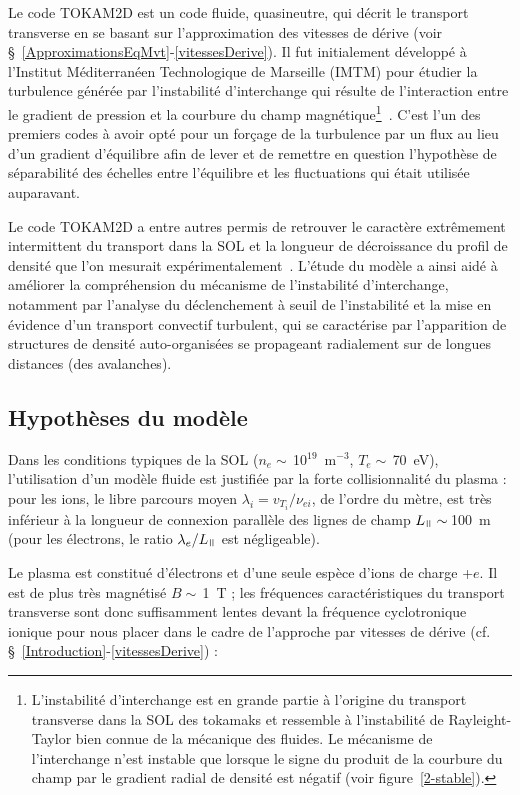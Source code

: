 \begin{refsection}
Le code TOKAM2D est un code fluide, quasineutre, qui décrit le transport
transverse en se basant sur l'approximation des vitesses de dérive (voir
\S~\ref{ApproximationsEqMvt}-\ref{vitessesDerive}). Il fut initialement
développé à l'Institut Méditerranéen Technologique de Marseille (IMTM) pour
étudier la turbulence générée par l'instabilité
d'interchange qui résulte de
l'interaction entre le gradient de pression et la courbure du champ
magnétique\footnote{L'instabilité d'interchange est en grande partie
à l'origine du transport transverse dans la SOL des tokamaks et ressemble à l'instabilité de Rayleight-Taylor bien
connue de la mécanique des fluides.
Le mécanisme de l'interchange n'est instable que lorsque le signe du produit de
la courbure du champ par le gradient radial de densité est négatif (voir
figure~\ref{2-stable}).}~\parencite{Garbet}.
C'est l'un des premiers codes à avoir opté pour un forçage de la turbulence par
un flux au lieu d'un gradient d'équilibre afin de lever et de remettre en question l'hypothèse de séparabilité des échelles entre l'équilibre et les fluctuations qui était utilisée auparavant.

Le code TOKAM2D a entre autres permis de retrouver le caractère extrêmement
intermittent du transport dans la SOL et la longueur de décroissance du profil de densité que l'on
mesurait expérimentalement~\cite{SarazinPhD}. L'étude du modèle a ainsi aidé à
améliorer la compréhension du mécanisme de l'instabilité d'interchange,
notamment par l'analyse
du déclenchement à seuil de l'instabilité et la mise en évidence d'un transport
convectif turbulent, qui se caractérise par l'apparition de structures de
densité auto-organisées se propageant radialement sur de longues distances (des avalanches).

\subsection{Hypothèses du modèle}
\label{2-hypotheses}
Dans les conditions typiques de la SOL ($n_e\sim\,$10$^{19}$~m$^{-3}$,
$T_e\sim\,$70~eV), l'utilisation d'un modèle fluide est justifiée par la forte
collisionnalité du plasma : pour les ions, le libre parcours moyen
$\lambda_i=v_{{T}_{i}}/\nu_{ei}$, de l'ordre du mètre, est très
inférieur à la longueur de connexion parallèle des lignes de champ
$L_\para\sim\,$100~m (pour les électrons, le ratio $\lambda_e/L_\para$ est
négligeable).

Le plasma est constitué d'électrons et d'une seule espèce d'ions de charge +$e$.
Il est de plus très magnétisé $B\sim\,$1~T ; les fréquences caractéristiques du
transport transverse sont donc suffisamment lentes devant la fréquence cyclotronique
ionique pour nous placer dans le cadre de l'approche par vitesses de dérive (cf.
\S~\ref{Introduction}-\ref{vitessesDerive}) :


\end{refsection}
